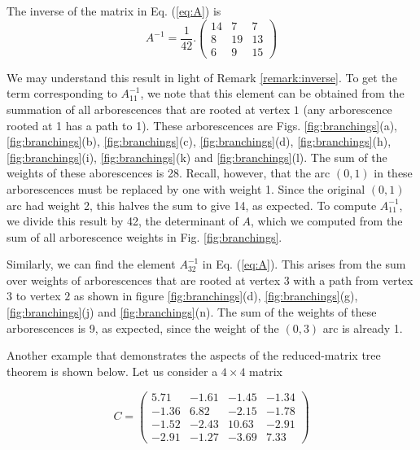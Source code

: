 \documentclass{article}
\begin{document}
The inverse of the matrix in Eq. (\ref{eq:A}) is
\begin{equation}
    A^{-1} = \frac{1}{42}.\begin{pmatrix}
14 & 7 & 7\\
 8 & 19 & 13 \\
6  & 9 & 15
\end{pmatrix}
\label{eq:Ai}
\end{equation}

We may understand this result in light of Remark \ref{remark:inverse}.
To get the term corresponding to $A^{-1}_{11}$, we note that this element can be obtained from the summation of all arborescences that are rooted at vertex $1$ (any arborescence rooted at 1 has a path to 1). These arborescences are Figs. \ref{fig:branchings}(a), \ref{fig:branchings}(b), \ref{fig:branchings}(c), \ref{fig:branchings}(d), \ref{fig:branchings}(h), \ref{fig:branchings}(i), \ref{fig:branchings}(k) and \ref{fig:branchings}(l).  The sum of the weights of these aborescences is 28.  Recall, however, that the arc $(0, 1)$ in these arborescences must be replaced by one with weight 1.  Since the original $(0, 1)$ arc had weight 2, this halves the sum to give 14, as expected.  To compute $A^{-1}_{11}$, we divide this result by 42, the determinant of $A$, which we computed from the sum of all arborescence weights in Fig. \ref{fig:branchings}.

Similarly, we can find the element $A^{-1}_{32}$ in Eq. (\ref{eq:A}). This arises from the sum over weights of arborescences that are rooted at vertex $3$ with a path from vertex $3$ to vertex $2$ as shown in figure \ref{fig:branchings}(d),  \ref{fig:branchings}(g), \ref{fig:branchings}(j) and \ref{fig:branchings}(n).  The sum of the weights of these arborescences is 9, as expected, since the weight of the $(0, 3)$ arc is already 1.

Another example that demonstrates the aspects of the reduced-matrix tree theorem is shown below. Let us consider a $4 \times 4$ matrix  

\begin{equation}
    C = \begin{pmatrix}
5.71 & -1.61 & -1.45 & -1.34\\
-1.36 & 6.82 & -2.15 & -1.78\\
-1.52 & -2.43 & 10.63 & -2.91\\
-2.91 & -1.27 & -3.69 & 7.33
\end{pmatrix}
\label{eq:Mi}
\end{equation}
\end{document}
